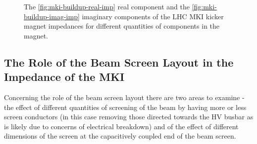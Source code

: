 \begin{figure}
\label{fig:mki-buildup-impedance}
\caption{The \ref{fig:mki-buildup-real-imp} real component and the \ref{fig:mki-buildup-imag-imp} imaginary components of the LHC MKI kicker magnet impedances for different quantities of components in the magnet.}
\end{figure}

\subsection{The Role of the Beam Screen Layout in the Impedance of the MKI}

Concerning the role of the beam screen layout there are two areas to examine - the effect of different quantities of screening of the beam by having more or less screen conductors (in this case removing those directed towards the HV busbar as is likely due to concerns of electrical breakdown) and of the effect of different dimensions of the screen at the capacitively coupled end of the beam screen.


